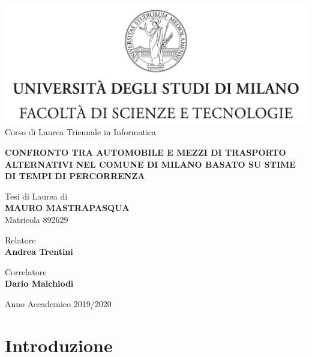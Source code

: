 \documentclass[a4paper,12pt]{report}
\newcommand\blankpage{
	\null
	\addtocounter{page}{-1}
	\thispagestyle{empty}
	\newpage
}
\begin{document}
\begin{titlepage}
\begin{center}
\includegraphics[width=\textwidth]{Logo.jpg}
\large{Corso di Laurea Triennale in Informatica}

\vspace{1.6cm}

\Large{\textbf{CONFRONTO TRA AUTOMOBILE E MEZZI DI TRASPORTO ALTERNATIVI NEL COMUNE DI MILANO BASATO SU STIME DI TEMPI DI PERCORRENZA}}

\vspace{1.4cm}

\large{Tesi di Laurea di} \\
\large{\textbf{MAURO MASTRAPASQUA}} \\
\large{Matricola 892629}
\end{center}

\begin{flushleft}
\vspace{1.6cm}

\normalsize{Relatore} \\
\normalsize{\textbf{Andrea Trentini}}

\vspace{0.4cm}

\normalsize{Correlatore} \\
\normalsize{\textbf{Dario Malchiodi}}
\end{flushleft}

\begin{center}
\vspace{1.6cm}

\large{Anno Accademico 2019/2020}
\end{center}
\end{titlepage}
\afterpage{\blankpage}

\tableofcontents

\chapter{Introduzione}

\end{document}
